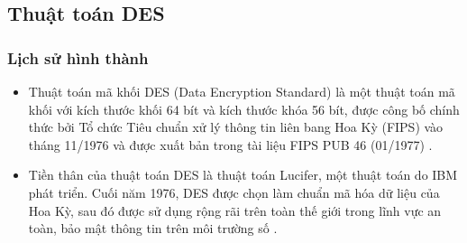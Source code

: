 \subsection{Thuật toán DES}
\subsubsection{Lịch sử hình thành}
\begin{itemize}
    \item Thuật toán mã khối DES (Data Encryption Standard) là một thuật toán mã khối với kích thước khối 64 bít và kích thước khóa 56 bít, được công bố chính thức bởi Tổ chức Tiêu chuẩn xử lý thông tin liên bang Hoa Kỳ (FIPS) vào tháng 11/1976 và được xuất bản trong tài liệu FIPS PUB 46 (01/1977) \cite{Khanh2014}.
    \item Tiền thân của thuật toán DES là thuật toán Lucifer, một thuật toán do IBM phát triển. Cuối năm 1976, DES được chọn làm chuẩn mã hóa dữ liệu của Hoa Kỳ, sau đó được sử dụng rộng rãi trên toàn thế giới trong lĩnh vực an toàn, bảo mật thông tin trên môi trường số \cite{Khanh2014}.
\end{itemize}
